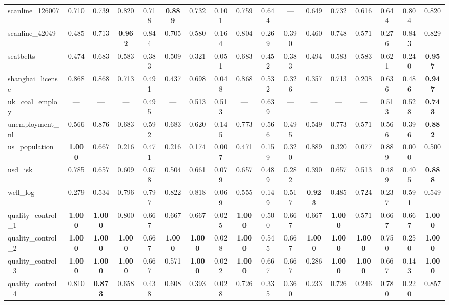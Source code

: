 \documentclass[11pt,a4paper]{article}
\begin{document}
\begin{table}
{\begin{tabular}{lcccccccccccccccc}
scanline\_126007 & 0.710 & 0.739 & 0.820 & 0.718 & \textbf{0.889} & 0.732 & 0.101 & 0.759 & 0.644 & — & 0.649 & 0.732 & 0.616 & 0.644 & 0.804 & 0.820 \\
scanline\_42049 & 0.485 & 0.713 & \textbf{0.962} & 0.844 & 0.705 & 0.580 & 0.164 & 0.804 & 0.269 & 0.390 & 0.460 & 0.748 & 0.571 & 0.276 & 0.843 & 0.829 \\
seatbelts & 0.474 & 0.683 & 0.583 & 0.383 & 0.509 & 0.321 & 0.051 & 0.683 & 0.452 & 0.383 & 0.494 & 0.583 & 0.583 & 0.621 & 0.240 & \textbf{0.957} \\
shanghai\_license & 0.868 & 0.868 & 0.713 & 0.491 & 0.437 & 0.698 & 0.048 & 0.868 & 0.532 & 0.326 & 0.357 & 0.713 & 0.208 & 0.636 & 0.486 & \textbf{0.947} \\
uk\_coal\_employ & — & — & — & 0.495 & — & 0.513 & 0.513 & — & 0.639 & — & — & — & — & 0.513 & 0.528 & \textbf{0.743} \\
unemployment\_nl & 0.566 & 0.876 & 0.683 & 0.592 & 0.683 & 0.620 & 0.145 & 0.773 & 0.566 & 0.495 & 0.549 & 0.773 & 0.571 & 0.566 & 0.396 & \textbf{0.882} \\
us\_population & \textbf{1.000} & 0.667 & 0.216 & 0.471 & 0.216 & 0.174 & 0.007 & 0.471 & 0.159 & 0.320 & 0.889 & 0.320 & 0.077 & 0.889 & 0.000 & 0.500 \\
usd\_isk & 0.785 & 0.657 & 0.609 & 0.678 & 0.504 & 0.661 & 0.079 & 0.657 & 0.489 & 0.282 & 0.390 & 0.657 & 0.513 & 0.489 & 0.405 & \textbf{0.888} \\
well\_log & 0.279 & 0.534 & 0.796 & 0.797 & 0.822 & 0.818 & 0.069 & 0.555 & 0.149 & 0.517 & \textbf{0.923} & 0.485 & 0.724 & 0.237 & 0.591 & 0.549 \\
quality\_control\_1 & \textbf{1.000} & \textbf{1.000} & 0.800 & 0.667 & 0.667 & 0.667 & 0.025 & \textbf{1.000} & 0.500 & 0.667 & 0.667 & \textbf{1.000} & 0.571 & 0.667 & 0.667 & \textbf{1.000} \\
quality\_control\_2 & \textbf{1.000} & \textbf{1.000} & \textbf{1.000} & 0.667 & \textbf{1.000} & \textbf{1.000} & 0.028 & \textbf{1.000} & 0.545 & 0.667 & \textbf{1.000} & \textbf{1.000} & \textbf{1.000} & 0.750 & 0.250 & \textbf{1.000} \\
quality\_control\_3 & \textbf{1.000} & \textbf{1.000} & \textbf{1.000} & 0.667 & 0.571 & \textbf{1.000} & 0.022 & \textbf{1.000} & 0.667 & 0.667 & 0.286 & \textbf{1.000} & \textbf{1.000} & 0.667 & 0.143 & \textbf{1.000} \\
quality\_control\_4 & 0.810 & \textbf{0.873} & 0.658 & 0.438 & 0.608 & 0.393 & 0.028 & 0.726 & 0.335 & 0.360 & 0.233 & 0.726 & 0.246 & 0.780 & 0.220 & 0.857 \\

\end{tabular}}
\end{table}
\end{document}
